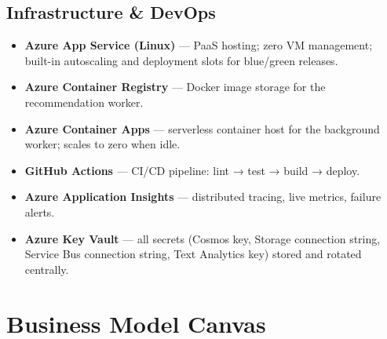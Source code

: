 \documentclass[12pt, a4paper]{report}
\begin{document}
\section{Infrastructure \& DevOps}

\begin{itemize}[nosep]
  \item \textbf{Azure App Service (Linux)} — PaaS hosting; zero VM management; built-in
    autoscaling and deployment slots for blue/green releases.
  \item \textbf{Azure Container Registry} — Docker image storage for the recommendation worker.
  \item \textbf{Azure Container Apps} — serverless container host for the background worker;
    scales to zero when idle.
  \item \textbf{GitHub Actions} — CI/CD pipeline: lint → test → build → deploy.
  \item \textbf{Azure Application Insights} — distributed tracing, live metrics, failure alerts.
  \item \textbf{Azure Key Vault} — all secrets (Cosmos key, Storage connection string,
    Service Bus connection string, Text Analytics key) stored and rotated centrally.
\end{itemize}

\chapter{Business Model Canvas}
\end{document}
